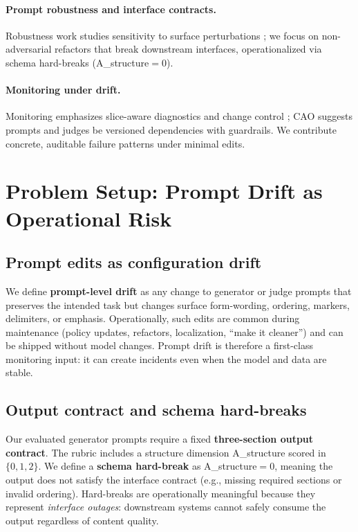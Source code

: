 \documentclass{article}
\newcommand{\Astruct}{A\_structure}
\begin{document}
\paragraph{Prompt robustness and interface contracts.} Robustness work studies sensitivity to surface perturbations \citep{zhu2023promptrobust}; we focus on non-adversarial refactors that break downstream interfaces, operationalized via schema hard-breaks (\Astruct$=0$).
\paragraph{Monitoring under drift.} Monitoring emphasizes slice-aware diagnostics and change control \citep{kang2020modelassertions,yao2022wildtime,baby2025adapting,hao2025nazar}; CAO suggests prompts and judges be versioned dependencies with guardrails. We contribute concrete, auditable failure patterns under minimal edits.

\section{Problem Setup: Prompt Drift as Operational Risk}
\subsection{Prompt edits as configuration drift}
We define \textbf{prompt-level drift} as any change to generator or judge prompts that preserves the intended task but changes surface form-wording, ordering, markers, delimiters, or emphasis.
Operationally, such edits are common during maintenance (policy updates, refactors, localization, ``make it cleaner'') and can be shipped without model changes.
Prompt drift is therefore a first-class monitoring input: it can create incidents even when the model and data are stable.

\subsection{Output contract and schema hard-breaks}
Our evaluated generator prompts require a fixed \textbf{three-section output contract}.
The rubric includes a structure dimension \Astruct{} scored in $\{0,1,2\}$.
We define a \textbf{schema hard-break} as \Astruct$=0$, meaning the output does not satisfy the interface contract (e.g., missing required sections or invalid ordering).
Hard-breaks are operationally meaningful because they represent \emph{interface outages}: downstream systems cannot safely consume the output regardless of content quality.
\end{document}

